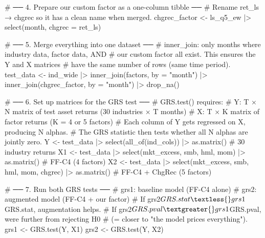 \documentclass[
  letterpaper,
  DIV=11,
  numbers=noendperiod]{scrartcl}
\newenvironment{Shaded}{\begin{snugshade}}{\end{snugshade}}
\newcommand{\AttributeTok}[1]{\textcolor[rgb]{0.40,0.45,0.13}{#1}}
\newcommand{\CommentTok}[1]{\textcolor[rgb]{0.37,0.37,0.37}{#1}}
\newcommand{\FunctionTok}[1]{\textcolor[rgb]{0.28,0.35,0.67}{#1}}
\newcommand{\NormalTok}[1]{\textcolor[rgb]{0.00,0.23,0.31}{#1}}
\newcommand{\OtherTok}[1]{\textcolor[rgb]{0.00,0.23,0.31}{#1}}
\newcommand{\SpecialCharTok}[1]{\textcolor[rgb]{0.37,0.37,0.37}{#1}}
\newcommand{\StringTok}[1]{\textcolor[rgb]{0.13,0.47,0.30}{#1}}
\begin{document}
\begin{Shaded}
\begin{Highlighting}[]
\CommentTok{\# ── 4. Prepare our custom factor as a one{-}column tibble ──}
\CommentTok{\# Rename ret\_ls → chgrec so it has a clean name when merged.}
\NormalTok{chgrec\_factor }\OtherTok{\textless{}{-}}\NormalTok{ ls\_q5\_ew }\SpecialCharTok{|\textgreater{}} \FunctionTok{select}\NormalTok{(month, }\AttributeTok{chgrec =}\NormalTok{ ret\_ls)}

\CommentTok{\# ── 5. Merge everything into one dataset ──}
\CommentTok{\# inner\_join: only months where industry data, factor data, AND}
\CommentTok{\# our custom factor all exist. This ensures the Y and X matrices}
\CommentTok{\# have the same number of rows (same time period).}
\NormalTok{test\_data }\OtherTok{\textless{}{-}}\NormalTok{ ind\_wide }\SpecialCharTok{|\textgreater{}}
  \FunctionTok{inner\_join}\NormalTok{(factors, }\AttributeTok{by =} \StringTok{"month"}\NormalTok{) }\SpecialCharTok{|\textgreater{}}
  \FunctionTok{inner\_join}\NormalTok{(chgrec\_factor, }\AttributeTok{by =} \StringTok{"month"}\NormalTok{) }\SpecialCharTok{|\textgreater{}}
  \FunctionTok{drop\_na}\NormalTok{()}

\CommentTok{\# ── 6. Set up matrices for the GRS test ──}
\CommentTok{\# GRS.test() requires:}
\CommentTok{\#   Y: T × N matrix of test asset returns (30 industries × T months)}
\CommentTok{\#   X: T × K matrix of factor returns (K = 4 or 5 factors)}
\CommentTok{\# Each column of Y gets regressed on X, producing N alphas.}
\CommentTok{\# The GRS statistic then tests whether all N alphas are jointly zero.}
\NormalTok{Y  }\OtherTok{\textless{}{-}}\NormalTok{ test\_data }\SpecialCharTok{|\textgreater{}} \FunctionTok{select}\NormalTok{(}\FunctionTok{all\_of}\NormalTok{(ind\_cols)) }\SpecialCharTok{|\textgreater{}} \FunctionTok{as.matrix}\NormalTok{() }\CommentTok{\# 30 industry returns}
\NormalTok{X1 }\OtherTok{\textless{}{-}}\NormalTok{ test\_data }\SpecialCharTok{|\textgreater{}} \FunctionTok{select}\NormalTok{(mkt\_excess, smb, hml, mom) }\SpecialCharTok{|\textgreater{}} \FunctionTok{as.matrix}\NormalTok{() }\CommentTok{\# FF{-}C4 (4 factors)}
\NormalTok{X2 }\OtherTok{\textless{}{-}}\NormalTok{ test\_data }\SpecialCharTok{|\textgreater{}} \FunctionTok{select}\NormalTok{(mkt\_excess, smb, hml, mom, chgrec) }\SpecialCharTok{|\textgreater{}} \FunctionTok{as.matrix}\NormalTok{() }\CommentTok{\# FF{-}C4 + ChgRec (5 factors)}

\CommentTok{\# ── 7. Run both GRS tests ──}
\CommentTok{\# grs1: baseline model (FF{-}C4 alone)}
\CommentTok{\# grs2: augmented model (FF{-}C4 + our factor)}
\CommentTok{\# If grs2$GRS.stat \textless{} grs1$GRS.stat, augmentation helps.}
\CommentTok{\# If grs2$GRS.pval \textgreater{} grs1$GRS.pval, we\textquotesingle{}re further from rejecting H0}
\CommentTok{\# (= closer to "the model prices everything").}
\NormalTok{grs1 }\OtherTok{\textless{}{-}} \FunctionTok{GRS.test}\NormalTok{(Y, X1)}
\NormalTok{grs2 }\OtherTok{\textless{}{-}} \FunctionTok{GRS.test}\NormalTok{(Y, X2)}


\end{Highlighting}
\end{Shaded}
\end{document}

